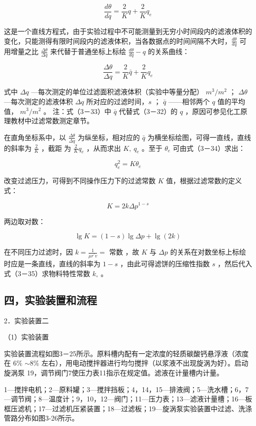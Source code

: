 \documentclass[
]{article}
\begin{document}
$$
\frac{d \theta}{d q}=\frac{2}{K} q + \frac{2}{K} q_e
$$

这是一个直线方程式，由于实验过程中不可能测量到无穷小时间段内的滤液体积的变化，只能测得有限时间段内的滤液体积，当各数据点的时间间隔不大时，$\frac{d \theta}{d q}$ 可用增量之比 $\frac{\Delta \theta}{\Delta q}$ 来代替于普通坐标上标绘 $\frac{d \theta}{d q}-q$ 的关系曲线：

$$
\frac{\Delta \theta}{\Delta q}=\frac{2}{K} \bar{q} + \frac{2}{K} q_e
$$

式中 $\Delta q$ —每次测定的单位过滤面积滤液体积（实验中等量分配） $m^3 / m^2$ ；
$\Delta \theta$ —每次测定的滤液体积 $\Delta q$ 所对应的过滤时间，$s$ ；
$\bar{q}$ ——相邻两个 $q$ 值的平均值， $m^3 / m^2$ 。
注：式（3－33）中 $\bar{q}$ 代替式（3－32）的 $q$ ，原因可参见化工原理教材中过滤常数测定章节。

在直角坐标系中，以 $\frac{\Delta \theta}{\Delta q}$ 为纵坐标，相对应的 $\bar{q}$ 为横坐标绘图，可得一直线，直线的斜率为 $\frac{2}{K}$ ，截距 为 $\frac{2}{K} q_e$ ，从而求出 $K, ~ q_e$ 。至于 $\theta_e$ 可由式（3－34）求出：

$$
q_e^2=K \theta_e
$$

改变过滤压力，可得到不同操作压力下的过滤常数 $K$ 值，根据过滤常数的定义式：

$$
K=2 k \Delta p^{1-s}
$$

两边取对数：

$$
\lg K=(1-s) \lg \Delta p + \lg (2 k)
$$

在不同压力过滤时，因 $k=\frac{1}{\mu r^{\prime} v}=$ 常数 ，故 $K$ 与 $\Delta p$ 的关系在对数坐标上标绘时应是一条直线，直线的斜率为 $1-s$ ，由此可得滤饼的压缩性指数 $s$ ，然后代入式（3－35）求物料特性常数 $k_{\circ}$ 。

\subsection{四，实验装置和流程}

2．实验装置二

（1）实验装置

实验装置流程如图3－25所示。原料槽内配有一定浓度的轻质碳酸钙悬浮液（浓度在 $6\%$ $\sim 8\%$ 左右），用电动搅拌器进行均匀搅拌（以浆液不出现旋涡为好）。启动旋涡泵 19，调节阀门7使压力表11指示在规定值。滤液在计量槽内计量。

1—搅拌电机；2—原料罐；3—搅拌挡板；4，14，15—排液阀；5—洗水槽；6，7—调节阀；8—温度计；9，10，12—阀门；11—压力表；13—滤液计量槽；16—板框压滤机；17—过滤机压紧装置；18—过滤板；19—旋涡泵实验装置中过滤、洗涤管路分布如图3-26所示。
\end{document}

